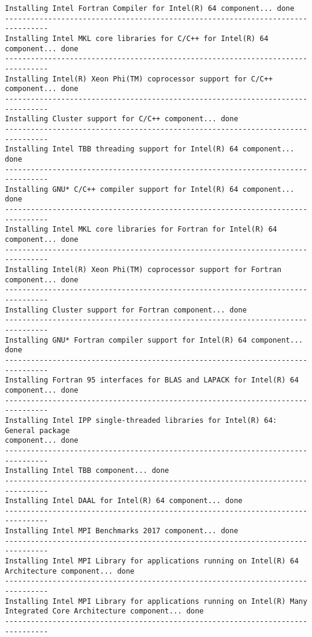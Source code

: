 \begin{lstlisting}
Installing Intel Fortran Compiler for Intel(R) 64 component... done
--------------------------------------------------------------------------------
Installing Intel MKL core libraries for C/C++ for Intel(R) 64 component... done
--------------------------------------------------------------------------------
Installing Intel(R) Xeon Phi(TM) coprocessor support for C/C++ component... done
--------------------------------------------------------------------------------
Installing Cluster support for C/C++ component... done
--------------------------------------------------------------------------------
Installing Intel TBB threading support for Intel(R) 64 component... done
--------------------------------------------------------------------------------
Installing GNU* C/C++ compiler support for Intel(R) 64 component... done
--------------------------------------------------------------------------------
Installing Intel MKL core libraries for Fortran for Intel(R) 64 component... done
--------------------------------------------------------------------------------
Installing Intel(R) Xeon Phi(TM) coprocessor support for Fortran component... done
--------------------------------------------------------------------------------
Installing Cluster support for Fortran component... done
--------------------------------------------------------------------------------
Installing GNU* Fortran compiler support for Intel(R) 64 component... done
--------------------------------------------------------------------------------
Installing Fortran 95 interfaces for BLAS and LAPACK for Intel(R) 64
component... done
--------------------------------------------------------------------------------
Installing Intel IPP single-threaded libraries for Intel(R) 64: General package 
component... done
--------------------------------------------------------------------------------
Installing Intel TBB component... done
--------------------------------------------------------------------------------
Installing Intel DAAL for Intel(R) 64 component... done
--------------------------------------------------------------------------------
Installing Intel MPI Benchmarks 2017 component... done
--------------------------------------------------------------------------------
Installing Intel MPI Library for applications running on Intel(R) 64
Architecture component... done
--------------------------------------------------------------------------------
Installing Intel MPI Library for applications running on Intel(R) Many
Integrated Core Architecture component... done
--------------------------------------------------------------------------------

\end{lstlisting}
